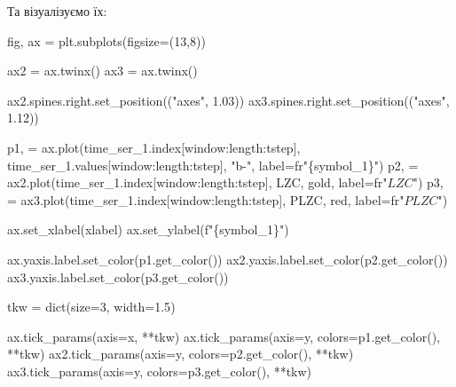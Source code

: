 \documentclass[
  letterpaper,
]{report}
\newenvironment{Shaded}{\begin{snugshade}}{\end{snugshade}}
\newcommand{\BuiltInTok}[1]{\textcolor[rgb]{0.00,0.23,0.31}{#1}}
\newcommand{\DecValTok}[1]{\textcolor[rgb]{0.68,0.00,0.00}{#1}}
\newcommand{\FloatTok}[1]{\textcolor[rgb]{0.68,0.00,0.00}{#1}}
\newcommand{\NormalTok}[1]{\textcolor[rgb]{0.00,0.23,0.31}{#1}}
\newcommand{\OperatorTok}[1]{\textcolor[rgb]{0.37,0.37,0.37}{#1}}
\newcommand{\SpecialCharTok}[1]{\textcolor[rgb]{0.37,0.37,0.37}{#1}}
\newcommand{\SpecialStringTok}[1]{\textcolor[rgb]{0.13,0.47,0.30}{#1}}
\newcommand{\StringTok}[1]{\textcolor[rgb]{0.13,0.47,0.30}{#1}}
\newcommand{\VerbatimStringTok}[1]{\textcolor[rgb]{0.13,0.47,0.30}{#1}}
\begin{document}
Та візуалізуємо їх:

\begin{Shaded}
\begin{Highlighting}[]
\NormalTok{fig, ax }\OperatorTok{=}\NormalTok{ plt.subplots(figsize}\OperatorTok{=}\NormalTok{(}\DecValTok{13}\NormalTok{,}\DecValTok{8}\NormalTok{))}

\NormalTok{ax2 }\OperatorTok{=}\NormalTok{ ax.twinx()}
\NormalTok{ax3 }\OperatorTok{=}\NormalTok{ ax.twinx()}

\NormalTok{ax2.spines.right.set\_position((}\StringTok{"axes"}\NormalTok{, }\FloatTok{1.03}\NormalTok{))}
\NormalTok{ax3.spines.right.set\_position((}\StringTok{"axes"}\NormalTok{, }\FloatTok{1.12}\NormalTok{))}

\NormalTok{p1, }\OperatorTok{=}\NormalTok{ ax.plot(time\_ser\_1.index[window:length:tstep], }
\NormalTok{                time\_ser\_1.values[window:length:tstep], }
                \StringTok{"b{-}"}\NormalTok{, }
\NormalTok{                label}\OperatorTok{=}\VerbatimStringTok{fr"}\SpecialCharTok{\{}\NormalTok{symbol\_1}\SpecialCharTok{\}}\VerbatimStringTok{"}\NormalTok{)}
\NormalTok{p2, }\OperatorTok{=}\NormalTok{ ax2.plot(time\_ser\_1.index[window:length:tstep],}
\NormalTok{                LZC,}
                \StringTok{\textquotesingle{}gold\textquotesingle{}}\NormalTok{, }
\NormalTok{                label}\OperatorTok{=}\VerbatimStringTok{fr"$LZC$"}\NormalTok{)}
\NormalTok{p3, }\OperatorTok{=}\NormalTok{ ax3.plot(time\_ser\_1.index[window:length:tstep],}
\NormalTok{                PLZC,}
                \StringTok{\textquotesingle{}red\textquotesingle{}}\NormalTok{, }
\NormalTok{                label}\OperatorTok{=}\VerbatimStringTok{fr"$PLZC$"}\NormalTok{)               }


\NormalTok{ax.set\_xlabel(xlabel)}
\NormalTok{ax.set\_ylabel(}\SpecialStringTok{f"}\SpecialCharTok{\{}\NormalTok{symbol\_1}\SpecialCharTok{\}}\SpecialStringTok{"}\NormalTok{)}

\NormalTok{ax.yaxis.label.set\_color(p1.get\_color())}
\NormalTok{ax2.yaxis.label.set\_color(p2.get\_color())}
\NormalTok{ax3.yaxis.label.set\_color(p3.get\_color())}

\NormalTok{tkw }\OperatorTok{=} \BuiltInTok{dict}\NormalTok{(size}\OperatorTok{=}\DecValTok{3}\NormalTok{, width}\OperatorTok{=}\FloatTok{1.5}\NormalTok{)}

\NormalTok{ax.tick\_params(axis}\OperatorTok{=}\StringTok{\textquotesingle{}x\textquotesingle{}}\NormalTok{, }\OperatorTok{**}\NormalTok{tkw)}
\NormalTok{ax.tick\_params(axis}\OperatorTok{=}\StringTok{\textquotesingle{}y\textquotesingle{}}\NormalTok{, colors}\OperatorTok{=}\NormalTok{p1.get\_color(), }\OperatorTok{**}\NormalTok{tkw)}
\NormalTok{ax2.tick\_params(axis}\OperatorTok{=}\StringTok{\textquotesingle{}y\textquotesingle{}}\NormalTok{, colors}\OperatorTok{=}\NormalTok{p2.get\_color(), }\OperatorTok{**}\NormalTok{tkw)}
\NormalTok{ax3.tick\_params(axis}\OperatorTok{=}\StringTok{\textquotesingle{}y\textquotesingle{}}\NormalTok{, colors}\OperatorTok{=}\NormalTok{p3.get\_color(), }\OperatorTok{**}\NormalTok{tkw)}


\end{Highlighting}
\end{Shaded}
\end{document}
